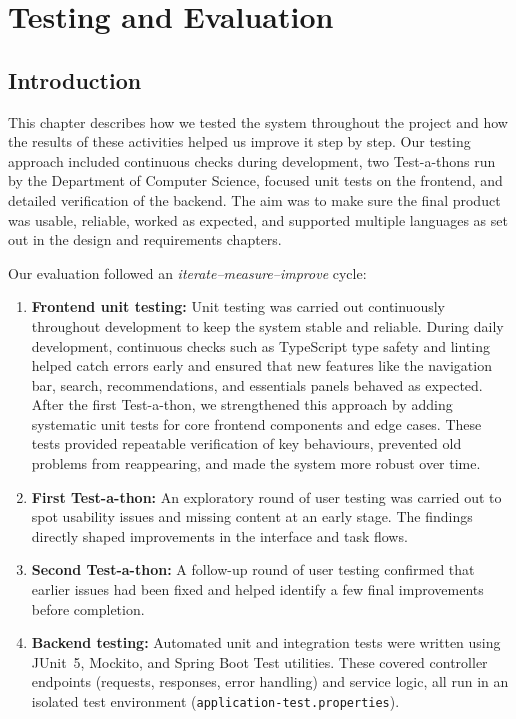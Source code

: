\chapter{Testing and Evaluation}

\section{Introduction}

This chapter describes how we tested the system throughout the project and how the results of these
activities helped us improve it step by step. Our testing approach included continuous checks during
development, two Test-a-thons run by the Department of Computer Science, focused unit tests on the
frontend, and detailed verification of the backend. The aim was to make sure the final product was usable,
reliable, worked as expected, and supported multiple languages as set out in the design and requirements
chapters.

Our evaluation followed an \emph{iterate--measure--improve} cycle:
\begin{enumerate}
    \item \textbf{Frontend unit testing:} Unit testing was carried out continuously throughout development to keep the system stable and reliable. During daily development, continuous checks such as TypeScript type safety and linting helped catch errors early and ensured that new features like the navigation bar, search, recommendations, and essentials panels behaved as expected. After the first Test-a-thon, we strengthened this approach by adding systematic unit tests for core frontend components and edge cases. These tests provided repeatable verification of key behaviours, prevented old problems from reappearing, and made the system more robust over time.
    \item \textbf{First Test-a-thon:} An exploratory round of user testing was carried out to spot usability issues and missing content at an early stage. The findings directly shaped improvements in the interface and task flows.
    \item \textbf{Second Test-a-thon:} A follow-up round of user testing confirmed that earlier issues had been fixed and helped identify a few final improvements before completion.
    \item \textbf{Backend testing:} Automated unit and integration tests were written using JUnit~5, Mockito, and Spring Boot Test utilities. These covered controller endpoints (requests, responses, error handling) and service logic, all run in an isolated test environment (\texttt{application-test.properties}).
\end{enumerate}

